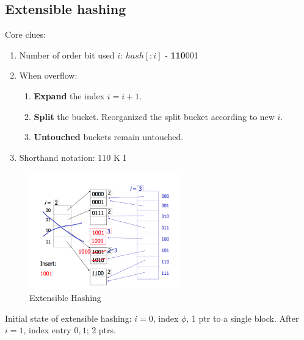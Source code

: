 \documentclass[a4paper]{report}
\begin{document}
\subsection{Extensible hashing}
Core clues:
\begin{enumerate}
\item Number of  order bit used $i$: $hash[:i]$ - \textbf{110}001
\item When overflow:
  \begin{enumerate}
  \item \textbf{Expand} the index $i=i+1$.
  \item \textbf{Split} the bucket. Reorganized the split bucket according to new $i$.
  \item \textbf{Untouched} buckets remain untouched.
  \end{enumerate}
\item Shorthand notation: 110  K I
\end{enumerate}
\begin{figure}[H]
        \centerline{\includegraphics[height = 2in]{img/extensible_hashing}}
        \caption{Extensible Hashing}
    \label{fig:extensibleHashing}
\end{figure}
Initial state of extensible hashing: $i=0$, index $\phi$, 1 ptr to a single block. After $i=1$, index entry $0, 1$; 2 ptrs.
\end{document}
